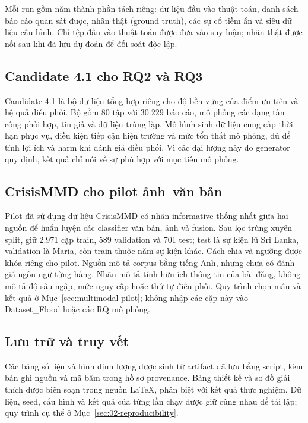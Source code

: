 Mỗi run gồm năm thành phần tách riêng: dữ liệu đầu vào thuật toán, danh sách báo cáo quan sát được, nhãn thật (ground truth), các sự cố tiềm ẩn và siêu dữ liệu cấu hình. Chỉ tệp đầu vào thuật toán được đưa vào suy luận; nhãn thật được nối sau khi đã lưu dự đoán để đối soát độc lập.

\subsection{Candidate 4.1 cho RQ2 và RQ3}
Candidate 4.1 là bộ dữ liệu tổng hợp riêng cho độ bền vững của điểm ưu tiên và hệ quả điều phối. Bộ gồm 80 tập với 30.229 báo cáo, mô phỏng các dạng tấn công phối hợp, tin giả và dữ liệu trùng lặp. Mô hình sinh dữ liệu cung cấp thời hạn phục vụ, điều kiện tiếp cận hiện trường và mức tổn thất mô phỏng, đủ để tính lợi ích và harm khi đánh giá điều phối. Vì các đại lượng này do generator quy định, kết quả chỉ nói về sự phù hợp với mục tiêu mô phỏng.

\subsection{CrisisMMD cho pilot ảnh--văn bản}
Pilot đã sử dụng dữ liệu CrisisMMD \citep{alam2018crisismmd} có nhãn informative thống nhất giữa hai nguồn để huấn luyện các classifier văn bản, ảnh và fusion. Sau lọc trùng xuyên split, giữ 2.971 cặp train, 589 validation và 701 test; test là sự kiện lũ Sri Lanka, validation là Maria, còn train thuộc năm sự kiện khác. Cách chia và ngưỡng được khóa riêng cho pilot. Nguồn mô tả corpus bằng tiếng Anh, nhưng chưa có đánh giá ngôn ngữ từng hàng. Nhãn mô tả tính hữu ích thông tin của bài đăng, không mô tả độ sâu ngập, mức nguy cấp hoặc thứ tự điều phối. Quy trình chọn mẫu và kết quả ở Mục~\ref{sec:multimodal-pilot}; không nhập các cặp này vào Dataset\_Flood hoặc các RQ mô phỏng.

\subsection{Lưu trữ và truy vết}
Các bảng số liệu và hình định lượng được sinh từ artifact đã lưu bằng script, kèm bản ghi nguồn và mã băm trong hồ sơ provenance. Bảng thiết kế và sơ đồ giải thích được biên soạn trong nguồn LaTeX, phân biệt với kết quả thực nghiệm. Dữ liệu, seed, cấu hình và kết quả của từng lần chạy được giữ cùng nhau để tái lập; quy trình cụ thể ở Mục~\ref{sec:02-reproducibility}.
